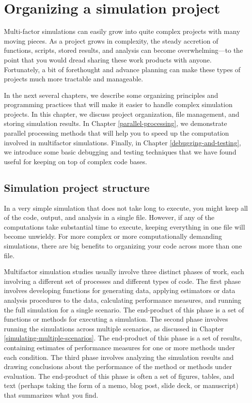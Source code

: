 \documentclass[
]{book}
\begin{document}
\chapter{Organizing a simulation project}\label{organizing-a-simulation-project}

Multi-factor simulations can easily grow into quite complex projects with many moving pieces.
As a project grows in complexity, the steady accretion of functions, scripts, stored results, and analysis can become overwhelming---to the point that you would dread sharing these work products with anyone.
Fortunately, a bit of forethought and advance planning can make these types of projects much more tractable and manageable.

In the next several chapters, we describe some organizing principles and programming practices that will make it easier to handle complex simulation projects.
In this chapter, we discuss project organization, file management, and storing simulation results.
In Chapter \ref{parallel-processing}, we demonstrate parallel processing methods that will help you to speed up the computation involved in multifactor simulations.
Finally, in Chapter \ref{debugging-and-testing}, we introduce some basic debugging and testing techniques that we have found useful for keeping on top of complex code bases.

\section{Simulation project structure}\label{simulation-project-structure}

In a very simple simulation that does not take long to execute, you might keep all of the code, output, and analysis in a single file.
However, if any of the computations take substantial time to execute, keeping everything in one file will become unwieldy.
For more complex or more computationally demanding simulations, there are big benefits to organizing your code across more than one file.

Multifactor simulation studies usually involve three distinct phases of work, each involving a different set of processes and different types of code.
The first phase involves developing functions for generating data, applying estimators or data analysis procedures to the data, calculating performance measures, and running the full simulation for a single scenario.
The end-product of this phase is a set of functions or methods for executing a simulation.
The second phase involves running the simulations across multiple scenarios, as discussed in Chapter \ref{simulating-multiple-scenarios}.
The end-product of this phase is a set of results, containing estimates of performance measures for one or more methods under each condition.
The third phase involves analyzing the simulation results and drawing conclusions about the performance of the method or methods under evaluation.
The end-product of this phase is often a set of figures, tables, and text (perhaps taking the form of a memo, blog post, slide deck, or manuscript) that summarizes what you find.
\end{document}

